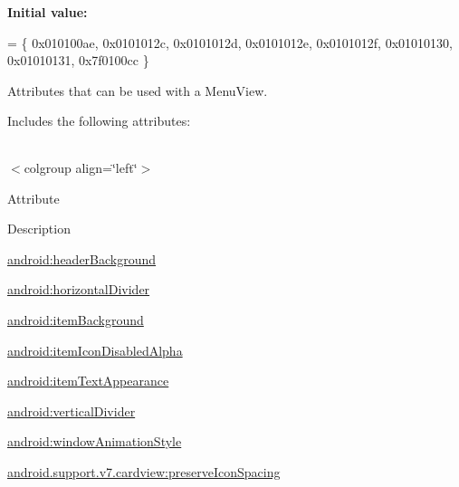 {\bfseries Initial value\+:}
\begin{DoxyCode}
= \{
            0x010100ae, 0x0101012c, 0x0101012d, 0x0101012e,
            0x0101012f, 0x01010130, 0x01010131, 0x7f0100cc
        \}
\end{DoxyCode}
Attributes that can be used with a Menu\+View. 

Includes the following attributes\+:

\tabulinesep=1mm
\begin{longtabu} spread 0pt [c]{*{0}{|X[-1]}|}
\hline
\end{longtabu}
$<$colgroup align=\char`\"{}left\char`\"{}$>$ 

Attribute

Description 

{\ttfamily \hyperlink{classandroid_1_1support_1_1v7_1_1cardview_1_1R_1_1styleable_ad369ecde0cd35828e7b4a9336f071466}{android\+:header\+Background}}

{\ttfamily \hyperlink{classandroid_1_1support_1_1v7_1_1cardview_1_1R_1_1styleable_a0916d50618f89895e6df0b142231d24a}{android\+:horizontal\+Divider}}

{\ttfamily \hyperlink{classandroid_1_1support_1_1v7_1_1cardview_1_1R_1_1styleable_a182217b0f7048467ba6a4b0e8a76e75c}{android\+:item\+Background}}

{\ttfamily \hyperlink{classandroid_1_1support_1_1v7_1_1cardview_1_1R_1_1styleable_acec3ed96639af2fa54857ab78e9bf691}{android\+:item\+Icon\+Disabled\+Alpha}}

{\ttfamily \hyperlink{classandroid_1_1support_1_1v7_1_1cardview_1_1R_1_1styleable_a0f18c10021a7e3cf802a23e020c87698}{android\+:item\+Text\+Appearance}}

{\ttfamily \hyperlink{classandroid_1_1support_1_1v7_1_1cardview_1_1R_1_1styleable_a53166c0c74f66a1053b4e2b8ed449af3}{android\+:vertical\+Divider}}

{\ttfamily \hyperlink{classandroid_1_1support_1_1v7_1_1cardview_1_1R_1_1styleable_a756c77c2bece7262d2b3864bd0855483}{android\+:window\+Animation\+Style}}

{\ttfamily \hyperlink{classandroid_1_1support_1_1v7_1_1cardview_1_1R_1_1styleable_a034320428c37d4f5c21c75f35207c020}{android.\+support.\+v7.\+cardview\+:preserve\+Icon\+Spacing}}

